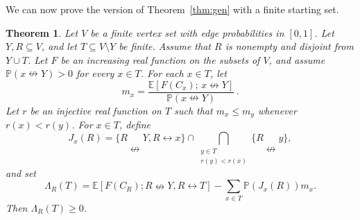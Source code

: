 \documentclass[11pt]{article}
\newtheorem{theorem}{Theorem}[section]
\theoremstyle{definition}
\theoremstyle{remark}
\newcommand{\PP}{\mathbb P}
\newcommand{\EE}{\mathbb E}
\newcommand{\con}{\leftrightarrow}
\newcommand{\ncon}{\nleftrightarrow}
\begin{document}
We can now prove the version of Theorem~\ref{thm:gen} with a finite starting set.

\begin{theorem}\label{thm:pairgen}
Let $V$ be a finite vertex set with edge probabilities in $[0,1]$. Let $Y,R\subseteq V$,
and let $T\subseteq V\setminus Y$ be finite. Assume that $R$ is nonempty and disjoint from
$Y\cup T$. Let $F$ be an increasing real function on the subsets of $V$, and assume
$\PP(x\ncon Y)>0$ for every $x\in T$. For each $x\in T$, let
\[
 m_x=\frac{\EE[F(C_x);\,x\ncon Y]}{\PP(x\ncon Y)}\,.
\]
Let $r$ be an injective real function on $T$ such that $m_x\leq m_y$ whenever
$r(x)<r(y)$. For $x\in T$, define
\[
 J_x(R)=\{R\ncon Y,R\con x\}\cap
 \bigcap_{\substack{y\in T\\r(y)<r(x)}}\{R\ncon y\},
\]
and set
\[
 \Lambda_R(T)=\EE[F(C_R);R\ncon Y,R\con T]
 -\sum_{x\in T}\PP(J_x(R))m_x.
\]
Then $\Lambda_R(T)\geq0$.
\end{theorem}
\end{document}
